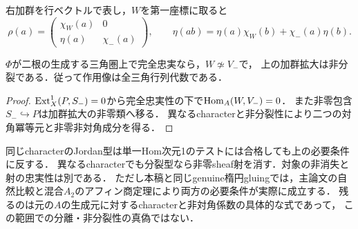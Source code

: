 右加群を行ベクトルで表し，$W$を第一座標に取ると
\[
\rho(a)=\begin{pmatrix}\chi_W(a)&0\\\eta(a)&\chi_-(a)\end{pmatrix},\qquad
\eta(ab)=\eta(a)\chi_W(b)+\chi_-(a)\eta(b).
\]
\begin{proposition}[導来完全忠実性の必要条件]
\label{prop:a2-character-obstructions}
$\Phi$が二根の生成する三角圏上で完全忠実なら，$W\not\simeq V_-$で，
上の加群拡大は非分裂である．従って作用像は全三角行列代数である．
\end{proposition}
\begin{proof}
$\operatorname{Ext}_X^1(P,S_-)=0$から完全忠実性の下で$\operatorname{Hom}_A(W,V_-)=0$．
また非零包含$S_-\hookrightarrow P$は加群拡大の非零類へ移る．
異なるcharacterと非分裂性により二つの対角冪等元と非零非対角成分を得る．
\end{proof}
\begin{remark}
同じcharacterのJordan型は単一Hom次元1のテストには合格しても上の必要条件に反する．
異なるcharacterでも分裂型なら非零sheaf射を消す．対象の非消失と射の忠実性は別である．
ただし本稿と同じgenuine楕円gluingでは，主論文\cite{Hearts}の自然比較と混合$A_2$のアフィン商定理により両方の必要条件が実際に成立する．
残るのは元の$A$の生成元に対するcharacterと非対角係数の具体的な式であって，
この範囲での分離・非分裂性の真偽ではない．
\end{remark}
